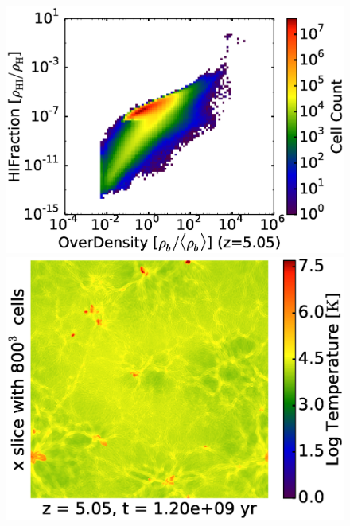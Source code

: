 \begin{figure}[!tp]
\begin{minipage}[h]{0.33\linewidth}
	\includegraphics[trim = 7mm 9mm 1mm 7mm, clip, width=1.0\textwidth]{5_1_HD24175OverDensityHIFraction.eps}
	\end{minipage}
\hspace*{-2.00mm}
	\begin{minipage}[h]{0.33\linewidth}
	\centering
	\includegraphics[trim = 10mm 0mm 7mm 7mm, clip, width=1.0\textwidth]{5_2_slice_Temperature_x_HD24175.eps}
	\end{minipage}
\hspace*{-2.00mm}
	\begin{minipage}[h]{0.33\linewidth}
	\centering

\end{minipage}
\end{figure}
